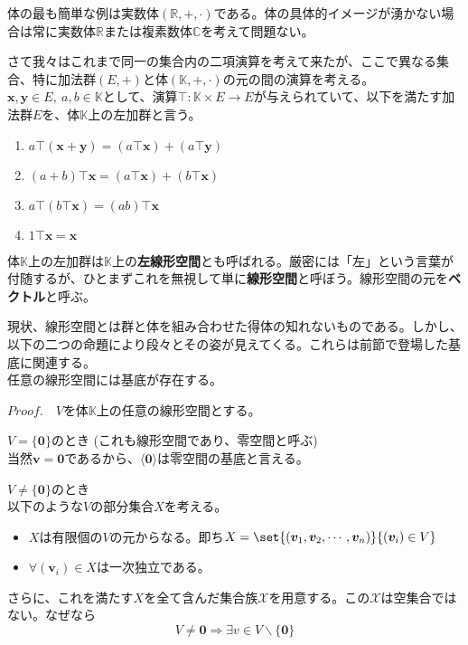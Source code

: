 \documentclass[dvipdfmx]{jsarticle}
\begin{document}
体の最も簡単な例は実数体$(\mathbb{R},+,\cdot)$である。体の具体的イメージが湧かない場合は常に実数体$\mathbb{R}$または複素数体$\mathbb{C}$を考えて問題ない。\par
さて我々はこれまで同一の集合内の二項演算を考えて来たが、ここで異なる集合、特に加法群$(E,+)$と体$(\mathbb{K},+,\cdot)$の元の間の演算を考える。$\bm{x},\bm{y} \in E,~a,b \in \mathbb{K}$として、演算$\top:\mathbb{K} \times E \rightarrow E$が与えられていて、以下を満たす加法群$E$を、体$\mathbb{K}$上の左加群と言う。
\begin{enumerate}
\item $a \top (\bm{x} + \bm{y}) = (a \top \bm{x})+(a \top \bm{y})$
\item $(a+b) \top \bm{x} = (a \top \bm{x})+(b \top \bm{x})$
\item $a \top (b \top \bm{x}) = (ab) \top \bm{x}$
\item $1 \top \bm{x} = \bm{x}$
\end{enumerate}
体$\mathbb{K}$上の左加群は$\mathbb{K}$上の\textbf{左線形空間}とも呼ばれる。厳密には「左」という言葉が付随するが、ひとまずこれを無視して単に\textbf{線形空間}と呼ぼう。線形空間の元を\textbf{ベクトル}と呼ぶ。\par
現状、線形空間とは群と体を組み合わせた得体の知れないものである。しかし、以下の二つの命題により段々とその姿が見えてくる。これらは前節で登場した基底に関連する。\\
任意の線形空間には基底が存在する。\\\par
$Proof.$　$V$を体$\mathbb{K}$上の任意の線形空間とする。\\\par
$V=\{\bm{0}\}$のとき (これも線形空間であり、零空間と呼ぶ)\\
当然$\bm{v}=\bm{0}$であるから、$\langle\bm{0}\rangle$は零空間の基底と言える。\\\par
$V\neq\{\bm{0}\}$のとき\\
以下のような$V$の部分集合$X$を考える。
\begin{itemize}
\item $X$は有限個の$V$の元からなる。即ち$X=\set{(\bm{v}_1,\bm{v}_2,\cdots,\bm{v}_n)}{(\bm{v}_i) \in V}$
\item $\forall(\bm{v}_i) \in X$は一次独立である。
\end{itemize}
さらに、これを満たす$X$を全て含んだ集合族$\mathscr{X}$を用意する。この$\mathscr{X}$は空集合ではない。なぜなら
\[V\neq\bm{0}\Rightarrow\exists v \in V\backslash\{\bm{0}\}\]
\end{document}
